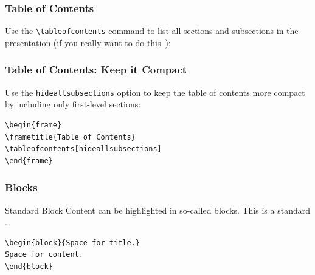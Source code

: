 \documentclass[utf8,aspectratio=169,ngerman,english]{beamer}
\begin{document}
\begin{frame}[containsverbatim]
\frametitle{Table of Contents}

Use the \verb|\tableofcontents| command to list all sections and subsections in the presentation (if you really want to do this~\cite{schultz}):

\medskip
\tableofcontents
\end{frame}


\begin{frame}[containsverbatim]
\frametitle{Table of Contents: Keep it Compact}

Use the \verb|hideallsubsections| option to keep the table of contents more compact by including only first-level sections:

\medskip
\tableofcontents[hideallsubsections]

\bigskip
\begin{lstlisting}[language={[LaTeX]TeX},numbers=none]
\begin{frame}
\frametitle{Table of Contents}
\tableofcontents[hideallsubsections]
\end{frame}
\end{lstlisting}
\end{frame}


\begin{frame}[containsverbatim]
\frametitle{Blocks}

\begin{block}{Standard Block}
Content can be highlighted in so-called blocks. This is a standard .
\end{block}

\begin{lstlisting}[language={[LaTeX]TeX},numbers=none]
\begin{block}{Space for title.}
Space for content.
\end{block} 
\end{lstlisting}
\end{frame}
\end{document}
